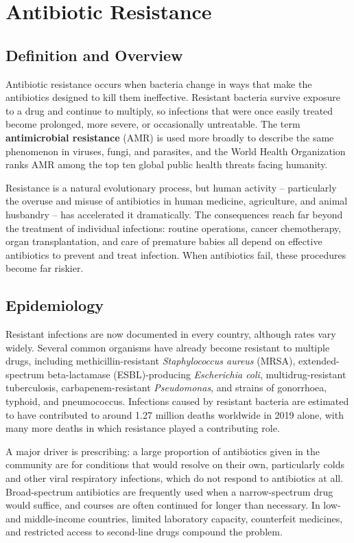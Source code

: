 \chapter{Antibiotic Resistance}

\section*{Definition and Overview}
Antibiotic resistance occurs when bacteria change in ways that make the antibiotics designed to kill them ineffective. Resistant bacteria survive exposure to a drug and continue to multiply, so infections that were once easily treated become prolonged, more severe, or occasionally untreatable. The term \textbf{antimicrobial resistance} (AMR) is used more broadly to describe the same phenomenon in viruses, fungi, and parasites, and the World Health Organization ranks AMR among the top ten global public health threats facing humanity.

Resistance is a natural evolutionary process, but human activity -- particularly the overuse and misuse of antibiotics in human medicine, agriculture, and animal husbandry -- has accelerated it dramatically. The consequences reach far beyond the treatment of individual infections: routine operations, cancer chemotherapy, organ transplantation, and care of premature babies all depend on effective antibiotics to prevent and treat infection. When antibiotics fail, these procedures become far riskier.

\section*{Epidemiology}
Resistant infections are now documented in every country, although rates vary widely. Several common organisms have already become resistant to multiple drugs, including methicillin-resistant \textit{Staphylococcus aureus} (MRSA), extended-spectrum beta-lactamase (ESBL)-producing \textit{Escherichia coli}, multidrug-resistant tuberculosis, carbapenem-resistant \textit{Pseudomonas}, and strains of gonorrhoea, typhoid, and pneumococcus. Infections caused by resistant bacteria are estimated to have contributed to around 1.27 million deaths worldwide in 2019 alone, with many more deaths in which resistance played a contributing role.

A major driver is prescribing: a large proportion of antibiotics given in the community are for conditions that would resolve on their own, particularly colds and other viral respiratory infections, which do not respond to antibiotics at all. Broad-spectrum antibiotics are frequently used when a narrow-spectrum drug would suffice, and courses are often continued for longer than necessary. In low- and middle-income countries, limited laboratory capacity, counterfeit medicines, and restricted access to second-line drugs compound the problem.

